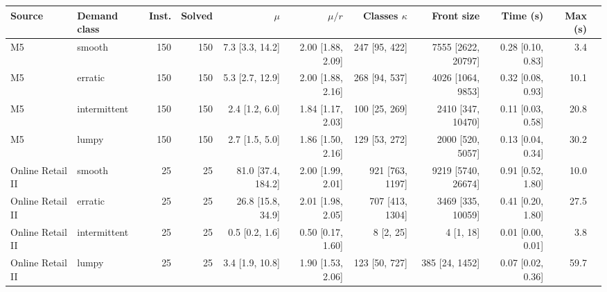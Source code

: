 \begin{tabular}{@{}llrrrrrrrrr@{}}
\toprule
Source & Demand class & Inst. & Solved & $\mu$ & $\mu/r$ & Classes $\kappa$ & Front size & Time (s) & Max (s) \\
\midrule
M5 & smooth & 150 & 150 & 7.3 [3.3, 14.2] & 2.00 [1.88, 2.09] & 247 [95, 422] & 7555 [2622, 20797] & 0.28 [0.10, 0.83] & 3.4 \\
M5 & erratic & 150 & 150 & 5.3 [2.7, 12.9] & 2.00 [1.88, 2.16] & 268 [94, 537] & 4026 [1064, 9853] & 0.32 [0.08, 0.93] & 10.1 \\
M5 & intermittent & 150 & 150 & 2.4 [1.2, 6.0] & 1.84 [1.17, 2.03] & 100 [25, 269] & 2410 [347, 10470] & 0.11 [0.03, 0.58] & 20.8 \\
M5 & lumpy & 150 & 150 & 2.7 [1.5, 5.0] & 1.86 [1.50, 2.16] & 129 [53, 272] & 2000 [520, 5057] & 0.13 [0.04, 0.34] & 30.2 \\
Online Retail II & smooth & 25 & 25 & 81.0 [37.4, 184.2] & 2.00 [1.99, 2.01] & 921 [763, 1197] & 9219 [5740, 26674] & 0.91 [0.52, 1.80] & 10.0 \\
Online Retail II & erratic & 25 & 25 & 26.8 [15.8, 34.9] & 2.01 [1.98, 2.05] & 707 [413, 1304] & 3469 [335, 10059] & 0.41 [0.20, 1.80] & 27.5 \\
Online Retail II & intermittent & 25 & 25 & 0.5 [0.2, 1.6] & 0.50 [0.17, 1.60] & 8 [2, 25] & 4 [1, 18] & 0.01 [0.00, 0.01] & 3.8 \\
Online Retail II & lumpy & 25 & 25 & 3.4 [1.9, 10.8] & 1.90 [1.53, 2.06] & 123 [50, 727] & 385 [24, 1452] & 0.07 [0.02, 0.36] & 59.7 \\
\bottomrule
\end{tabular}
